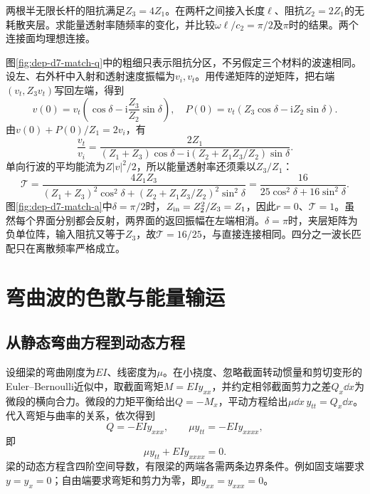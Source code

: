 \begin{example}[四分之一波长匹配层]
两根半无限长杆的阻抗满足$Z_3=4Z_1$。在两杆之间接入长度$\ell$、阻抗$Z_2=2Z_1$的无耗散夹层。求能量透射率随频率的变化，并比较$\omega\ell/c_2=\pi/2$及$\pi$时的结果。两个连接面均理想连接。
\end{example}
\begin{solution}
图\ref{fig:dep-d7-match-q}中的粗细只表示阻抗分区，不另假定三个材料的波速相同。设左、右外杆中入射和透射速度振幅为$v_i,v_t$。用传递矩阵的逆矩阵，把右端$(v_t,Z_3v_t)$写回左端，得到
\[
 v(0)=v_t\!\left(\cos\delta-\mathrm i\frac{Z_3}{Z_2}\sin\delta\right),
 \quad
 P(0)=v_t(Z_3\cos\delta-\mathrm iZ_2\sin\delta).
\]
由$v(0)+P(0)/Z_1=2v_i$，有
\[
 \frac{v_t}{v_i}=
 \frac{2Z_1}
 {(Z_1+Z_3)\cos\delta-\mathrm i(Z_2+Z_1Z_3/Z_2)\sin\delta}.
\]
单向行波的平均能流为$Z|v|^2/2$，所以能量透射率还须乘以$Z_3/Z_1$：
\[
 \mathcal T=
 \frac{4Z_1Z_3}
 {(Z_1+Z_3)^2\cos^2\delta+
 (Z_2+Z_1Z_3/Z_2)^2\sin^2\delta}
 =\boxed{\frac{16}{25\cos^2\delta+16\sin^2\delta}}.
\]
图\ref{fig:dep-d7-match-a}中$\delta=\pi/2$时，$Z_{\rm in}=Z_2^2/Z_3=Z_1$，因此$r=0$、$\mathcal T=1$。虽然每个界面分别都会反射，两界面的返回振幅在左端相消。$\delta=\pi$时，夹层矩阵为负单位阵，输入阻抗又等于$Z_3$，故$\mathcal T=16/25$，与直接连接相同。四分之一波长匹配只在离散频率严格成立。
\end{solution}

\section{弯曲波的色散与能量输运}
\subsection{从静态弯曲方程到动态方程}
设细梁的弯曲刚度为$EI$、线密度为$\mu$。在小挠度、忽略截面转动惯量和剪切变形的Euler--Bernoulli近似中，取截面弯矩$M=EIy_{xx}$，并约定相邻截面剪力之差$Q_x\dd x$为微段的横向合力。微段的力矩平衡给出$Q=-M_x$，平动方程给出$\mu\dd x\,y_{tt}=Q_x\dd x$。代入弯矩与曲率的关系，依次得到
\[
 Q=-EIy_{xxx},\qquad \mu y_{tt}=-EIy_{xxxx},
\]
即
\[
 \mu y_{tt}+EIy_{xxxx}=0.
\]
梁的动态方程含四阶空间导数，有限梁的两端各需两条边界条件。例如固支端要求$y=y_x=0$；自由端要求弯矩和剪力为零，即$y_{xx}=y_{xxx}=0$。

